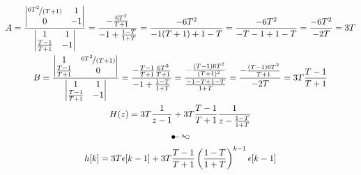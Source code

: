 \documentclass[11pt,a4paper,DIV=12]{scrartcl}
\begin{document}
\begin{gather}
	A=\frac{\begin{vmatrix}
			\nicefrac{6T^2}{(T+1)} & 1 \\
			0 & -1
	\end{vmatrix}}{\begin{vmatrix}
		1 & 1\\
		\frac{T-1}{T+1} & -1
	\end{vmatrix}}
	=\frac{-\frac{6T^2}{T+1}}{-1+\frac{1-T}{1+T}}=\frac{-6T^2}{-1(T+1)+1-T}=\frac{-6T^2}{-T-1+1-T}=\frac{-6T^2}{-2T}=3T\\
	B=\frac{\begin{vmatrix}
		1 & \nicefrac{6T^2}{(T+1)} \\
		\frac{T-1}{T+1} & 0
\end{vmatrix}}{\begin{vmatrix}
		1 & 1\\
		\frac{T-1}{T+1} & -1
\end{vmatrix}}
=\frac{-\frac{T-1}{T+1}\frac{6T^2}{T+1}}{-1+\frac{1-T}{1+T}}=\frac{-\frac{(T-1)6T^2}{(T+1)^2}}{\frac{-1-T+1-T}{1+T}}=\frac{-\frac{(T-1)6T^2}{T+1}}{-2T}=3T\frac{T-1}{T+1}\\
H(z)=3T\frac{1}{z-1}+3T\frac{T-1}{T+1}\frac{1}{z-\frac{1-T}{1+T}}\\
\Ztransf\nonumber\\
h[k]=3T\epsilon[k-1]+3T\frac{T-1}{T+1}\left(\frac{1-T}{1+T}\right)^{k-1}\epsilon[k-1]
\end{gather}
\renewcommand{\refname}{Buchzitate}
\clearpage

\end{document}
